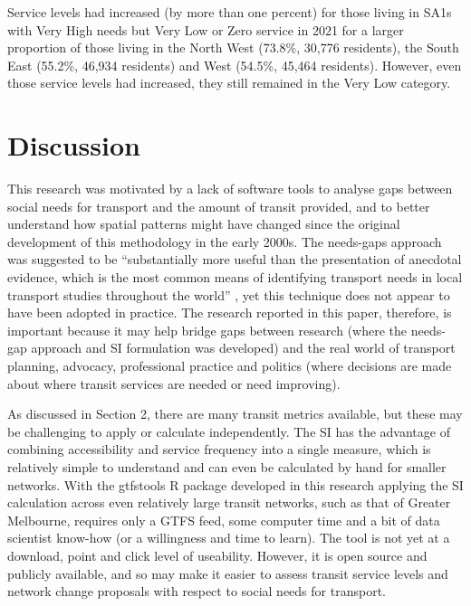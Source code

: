 \documentclass[preprint, 3p,
authoryear]{elsarticle} %
\begin{document}
Service levels had increased (by more than one percent) for those living
in SA1s with Very High needs but Very Low or Zero service in 2021 for a
larger proportion of those living in the North West (73.8\%, 30,776
residents), the South East (55.2\%, 46,934 residents) and West (54.5\%,
45,464 residents). However, even those service levels had increased,
they still remained in the Very Low category.

\hypertarget{discussion}{%
\section{Discussion}\label{discussion}}

This research was motivated by a lack of software tools to analyse gaps
between social needs for transport and the amount of transit provided,
and to better understand how spatial patterns might have changed since
the original development of this methodology in the early 2000s. The
needs-gaps approach was suggested to be ``substantially more useful than
the presentation of anecdotal evidence, which is the most common means
of identifying transport needs in local transport studies throughout the
world'' \citep{currie2010identifying}, yet this technique does not
appear to have been adopted in practice. The research reported in this
paper, therefore, is important because it may help bridge gaps between
research (where the needs-gap approach and SI formulation was developed)
and the real world of transport planning, advocacy, professional
practice and politics (where decisions are made about where transit
services are needed or need improving).

As discussed in Section 2, there are many transit metrics available, but
these may be challenging to apply or calculate independently. The SI has
the advantage of combining accessibility and service frequency into a
single measure, which is relatively simple to understand and can even be
calculated by hand for smaller networks. With the gtfstools R package
developed in this research applying the SI calculation across even
relatively large transit networks, such as that of Greater Melbourne,
requires only a GTFS feed, some computer time and a bit of data
scientist know-how (or a willingness and time to learn). The tool is not
yet at a download, point and click level of useability. However, it is
open source and publicly available, and so may make it easier to assess
transit service levels and network change proposals with respect to
social needs for transport.
\end{document}
